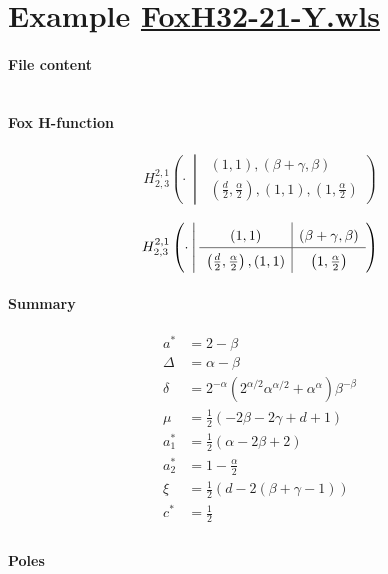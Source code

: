 \documentclass[11pt]{article}
\newcommand{\FoxH}[5]{H_{#2}^{#1}\left(#3\:\middle\vert\: \begin{array}{l}#4\\[0.4em] #5\end{array}\right)}
\begin{document}
\section{Example \url{FoxH32-21-Y.wls}}

\paragraph{File content}

\inputminted{text}{FoxH32-21-Y.wls}

\paragraph{Fox H-function}

\begin{align*}
  \FoxH
    {2,1}
    {2,3}
    {\cdot}
    {\left(1, 1\right), \left(\beta +\gamma, \beta\right)}
    {\left(\frac{d}{2}, \frac{\alpha }{2}\right), \left(1, 1\right), \left(1, \frac{\alpha }{2}\right)}
\end{align*}

\begin{align*}
  \FoxHext
    {2,1}
    {2,3}
    {\cdot}
    {\left(1, 1\right)}
    {\left(\beta +\gamma, \beta\right)}
    {\left(\frac{d}{2}, \frac{\alpha }{2}\right), \left(1, 1\right)}
    {\left(1, \frac{\alpha }{2}\right)}
\end{align*}

\paragraph{Summary}

\begin{align*}
  a^*    & = 2-\beta \\
  \Delta & = \alpha -\beta \\
  \delta & = 2^{-\alpha } \left(2^{\alpha /2} \alpha ^{\alpha /2}+\alpha ^{\alpha }\right) \beta ^{-\beta } \\
  \mu    & = \frac{1}{2} (-2 \beta -2 \gamma +d+1) \\
  a_1^*  & = \frac{1}{2} (\alpha -2 \beta +2) \\
  a_2^*  & = 1-\frac{\alpha }{2} \\
  \xi    & = \frac{1}{2} (d-2 (\beta +\gamma -1)) \\
  c^*    & = \frac{1}{2} \\
\end{align*}

\paragraph{Poles}
\end{document}
